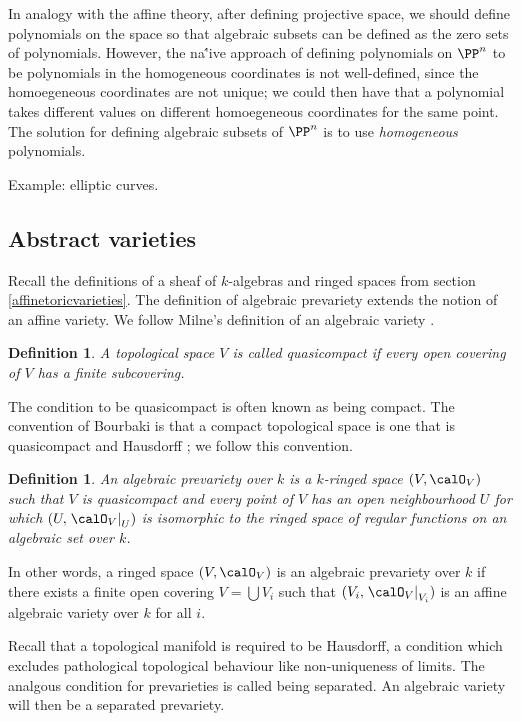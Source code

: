\documentclass[12pt]{amsart}
\theoremstyle{plain}
\newtheorem{definition}[theorem]{Definition}
\begin{document}
In analogy with the affine theory, after defining projective space, we should define polynomials on the space so that algebraic subsets can be defined as the zero sets of polynomials.
However, the na\''ive approach of defining polynomials on $\PP^n$ to be polynomials in the homogeneous coordinates is not well-defined, since the homoegeneous coordinates are not unique;
we could then have that a polynomial takes different values on different homoegeneous coordinates for the same point.
The solution for defining algebraic subsets of $\PP^n$ is to use \emph{homogeneous} polynomials.

Example: elliptic curves.





\subsection{Abstract varieties}
Recall the definitions of a sheaf of $k$-algebras and ringed spaces from section \ref{affinetoricvarieties}.
The definition of algebraic prevariety extends the notion of an affine variety.
We follow Milne's definition of an algebraic variety \cite{Milne13}.

\begin{definition}
A topological space $V$ is called quasicompact if every open covering of $V$ has a finite subcovering.
\end{definition}

The condition to be quasicompact is often known as being compact.
The convention of Bourbaki is that a compact topological space is one that is quasicompact and Hausdorff \cite[\S 2 g.]{Milne13}; we follow this convention.

\begin{definition}
An algebraic prevariety over $k$ is a $k$-ringed space $(V, \calO_V)$ such that $V$ is quasicompact and every point of $V$ has an open neighbourhood $U$ for which $(U, \left. \calO_V \right|_U)$ is isomorphic to the ringed space of regular functions on an algebraic set over $k$.
\end{definition}

In other words, a ringed space $(V, \calO_V)$ is an algebraic prevariety over $k$ if there exists a finite open covering $V = \bigcup V_i$ such that $(V_i, \left. \calO_V \right|_{V_i})$ is an affine algebraic variety over $k$ for all $i$.

Recall that a topological manifold is required to be Hausdorff, a condition which excludes pathological topological behaviour like non-uniqueness of limits.
The analgous condition for prevarieties is called being separated.
An algebraic variety will then be a separated prevariety.
\end{document}

